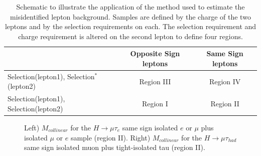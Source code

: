 \documentclass[oneside, letterpaper, oldfontcommands]{memoir}
\begin{document}
{{{\begin{table}[hbtp]
 \begin{center}
 \caption{Schematic to illustrate the application of the method used to estimate the misidentified lepton background. Samples
are defined by the charge of the two leptons and by the selection requirements on each. The selection requirement and charge requirement
is altered on the second lepton to define four regions.}
  \label{tab:fakeratediagram}
  \vspace{0.1in}
  \begin{tabular}{|l|c|c|} \hline
                                                   & Opposite Sign leptons &  Same Sign leptons     \\ \hline
Selection(lepton1), Selection$^{*}$(lepton2)          & Region III            &  Region IV             \\ \hline
Selection(lepton1), Selection(lepton2)              & Region I              &  Region II             \\ \hline
  \end{tabular}
 \end{center}
\end{table}



\begin{figure}[hbtp]\begin{center}
\caption{Left)  $M_{collinear}$ for the $H \rightarrow \mu \tau_{e}$ same sign isolated $e$ or $\mu$ plus isolated $\mu$ or $e$ sample (region II).
         Right) $M_{collinear}$ for the $H \rightarrow \mu \tau_{had}$ same sign isolated muon plus tight-isolated tau (region II). }
\label{fig:samesign_fakes}\end{center}\end{figure}


}}}
\end{document}

